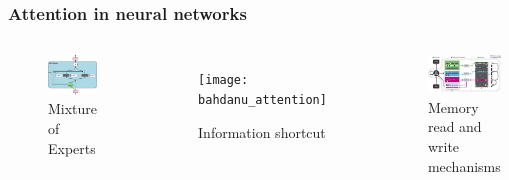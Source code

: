 \documentclass{beamer}
\begin{document}
  \begin{frame}
    \frametitle{Attention in neural networks}
    \begin{columns}
      \begin{figure}
        \includegraphics[width=\textwidth]{mixture_of_experts}
        \caption{Mixture of Experts}
      \end{figure}
      \begin{figure}
        \texttt{[image: bahdanu\_attention]}
        \caption{Information shortcut}
      \end{figure}
      \begin{figure}
        \includegraphics[width=\textwidth]{dnc}
        \caption{Memory read and write mechanisms}
      \end{figure}
    \end{columns}
    \vfill
    \tiny {}

    \tiny {}

    \tiny {}
  \end{frame}
\end{document}
